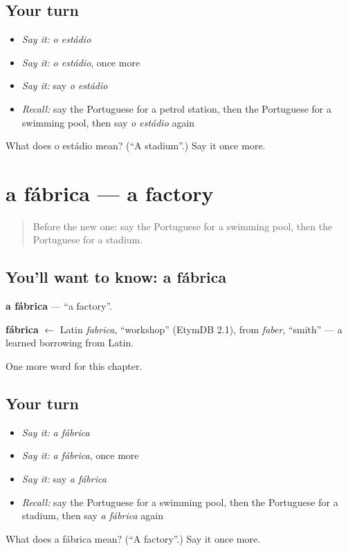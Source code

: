 \subsection*{Your turn}
\begin{itemize}
\raggedright
  \item \emph{Say it:} \emph{o estádio}
  \item \emph{Say it:} \emph{o estádio}, once more
  \item \emph{Say it:} say \emph{o estádio}
  \item \emph{Recall:} say the Portuguese for a petrol station, then the Portuguese for a swimming pool, then say \emph{o estádio} again
\end{itemize}

\begin{tcolorbox}[breakable,colback=teal!4,colframe=teal!35!black,title={Before you move on}]
What does o estádio mean? (\textquotedblleft{}A stadium\textquotedblright{}.) Say it once more.
\end{tcolorbox}
\section[a fábrica]{a fábrica — a factory}

\label{lesson:PT-C86-fabrica}



\begin{quote}
Before the new one: say the Portuguese for a swimming pool, then the Portuguese for a stadium.
\end{quote}

\subsection*{You'll want to know: a fábrica}
\textbf{a fábrica} — \textquotedblleft{}a factory\textquotedblright{}.

\begin{cousinweb}
\textbf{fábrica} $\leftarrow$ Latin \emph{fabrica}, \textquotedblleft{}workshop\textquotedblright{} (EtymDB 2.1), from \emph{faber}, \textquotedblleft{}smith\textquotedblright{} — a learned borrowing from Latin.
\end{cousinweb}

\begin{grammarlens}[title={What you've built}]
One more word for this chapter.
\end{grammarlens}

\subsection*{Your turn}
\begin{itemize}
\raggedright
  \item \emph{Say it:} \emph{a fábrica}
  \item \emph{Say it:} \emph{a fábrica}, once more
  \item \emph{Say it:} say \emph{a fábrica}
  \item \emph{Recall:} say the Portuguese for a swimming pool, then the Portuguese for a stadium, then say \emph{a fábrica} again
\end{itemize}

\begin{tcolorbox}[breakable,colback=teal!4,colframe=teal!35!black,title={Before you move on}]
What does a fábrica mean? (\textquotedblleft{}A factory\textquotedblright{}.) Say it once more.
\end{tcolorbox}
